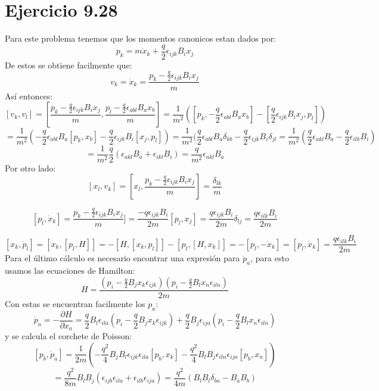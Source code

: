 \documentclass[letterpaper,10pt]{article}
\begin{document}
\section*{Ejercicio 9.28}
Para este problema tenemos que los momentos canonicos estan dados por:
$$p_k=m \dot x_k +\frac{q}{2} \epsilon_{ijk} B_i x_j$$
De estos se obtiene facilmente que:
$$v_k=\dot x_k=\frac{p_k-\frac{q}{2} \epsilon_{ijk} B_i x_j}{m}$$
As\'i entonces:
$$[v_k,v_l]=[\frac{p_k-\frac{q}{2} \epsilon_{ijk} B_i x_j}{m},\frac{p_l-\frac{q}{2} \epsilon_{abl} B_a x_b}{m}]=\frac{1}{m^2}([p_k,-\frac{q}{2} \epsilon_{abl} B_a x_b]-[\frac{q}{2} \epsilon_{ijk} B_i x_j,p_l])$$
$$=\frac{1}{m^2}(-\frac{q}{2}\epsilon_{abl} B_a [p_k,x_b]-\frac{q}{2} \epsilon_{ijk} B_i [x_j,p_l])=\frac{1}{m^2}(\frac{q}{2}\epsilon_{abl} B_a \delta_{kb}-\frac{q}{2} \epsilon_{ijk} B_i \delta_{jl}=\frac{1}{m^2}(\frac{q}{2}\epsilon_{akl} B_a-\frac{q}{2} \epsilon_{ilk} B_i)$$
$$=\frac{1}{m^2}\frac{q}{2} (\epsilon_{akl} B_a+\epsilon_{ikl} B_i)=\frac{q}{m^2} \epsilon_{akl} B_a$$
Por otro lado:
$$[x_l,v_k]=[x_l,\frac{p_k-\frac{q}{2} \epsilon_{ijk} B_i x_j}{m}]=\frac{\delta_{lk}}{m}$$

$$[p_l,\dot x_k]=\frac{p_k-\frac{q}{2} \epsilon_{ijk} B_i x_j}{m}]=\frac{-q \epsilon_{ijk} B_i }{2m} [p_l,x_j]=\frac{q \epsilon_{ijk} B_i }{2m}\delta_{l j}=\frac{q \epsilon_{ilk} B_i }{2m}$$

$$[x_k,\dot p_l]=[x_k,[p_l,H]]=-[H,[x_k,p_l]]-[p_l,[H,x_k]]=-[p_l,-\dot x_k]=[p_l,\dot x_k]=\frac{q \epsilon_{ilk} B_i }{2m}$$
Para el \'ultimo c\'alculo es necesario encontrar una expresi\'on para $\dot p_a$, para esto usamos las ecuaciones de Hamilton:
$$H=\frac{\left(p_i-\frac{q}{2} B_j x_k \epsilon_{ijk}\right)\left(p_i-\frac{q}{2} B_l x_n \epsilon_{iln}\right)}{2m}$$
Con estas se encuentran facilmente los $\dot p_a$:
$$\dot p_a=-\frac{\partial H}{\partial x_a}=
\frac{q}{2} B_l \epsilon_{ila} \left(p_i-\frac{q}{2} B_j x_k \epsilon_{ijk}\right) +
\frac{q}{2} B_j \epsilon_{ija} \left(p_i-\frac{q}{2} B_l x_n \epsilon_{iln}\right) $$
y se calcula el corchete de Poisson:
$$[p_b,\dot p_a]=\frac{1}{2m}\left(-\frac{q^2}{4} B_j B_l \epsilon_{ijk} \epsilon_{ila} [p_b,x_k]-\frac{q^2}{4} B_l B_j \epsilon_{iln} \epsilon_{ija} [p_b,x_n]                \right)$$
$$=\frac{q^2}{8m} B_l B_j (\epsilon_{ijb} \epsilon_{ila}+\epsilon_{ilb}\epsilon_{ija})=\frac{q^2}{4m}(B_l B_l \delta_{ba}-B_a B_b ) $$
\end{document}
